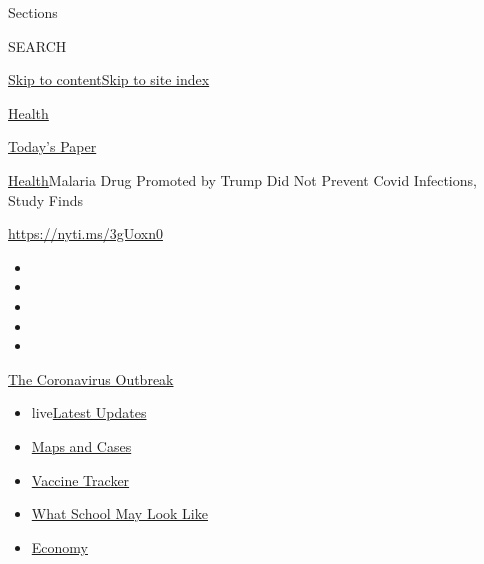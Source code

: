 Sections

SEARCH

\protect\hyperlink{site-content}{Skip to
content}\protect\hyperlink{site-index}{Skip to site index}

\href{https://www.nytimes3xbfgragh.onion/section/health}{Health}

\href{https://myaccount.nytimes3xbfgragh.onion/auth/login?response_type=cookie\&client_id=vi}{}

\href{https://www.nytimes3xbfgragh.onion/section/todayspaper}{Today's
Paper}

\href{/section/health}{Health}\textbar{}Malaria Drug Promoted by Trump
Did Not Prevent Covid Infections, Study Finds

\url{https://nyti.ms/3gUoxn0}

\begin{itemize}
\item
\item
\item
\item
\item
\end{itemize}

\href{https://www.nytimes3xbfgragh.onion/news-event/coronavirus?action=click\&pgtype=Article\&state=default\&region=TOP_BANNER\&context=storylines_menu}{The
Coronavirus Outbreak}

\begin{itemize}
\tightlist
\item
  live\href{https://www.nytimes3xbfgragh.onion/2020/08/01/world/coronavirus-covid-19.html?action=click\&pgtype=Article\&state=default\&region=TOP_BANNER\&context=storylines_menu}{Latest
  Updates}
\item
  \href{https://www.nytimes3xbfgragh.onion/interactive/2020/us/coronavirus-us-cases.html?action=click\&pgtype=Article\&state=default\&region=TOP_BANNER\&context=storylines_menu}{Maps
  and Cases}
\item
  \href{https://www.nytimes3xbfgragh.onion/interactive/2020/science/coronavirus-vaccine-tracker.html?action=click\&pgtype=Article\&state=default\&region=TOP_BANNER\&context=storylines_menu}{Vaccine
  Tracker}
\item
  \href{https://www.nytimes3xbfgragh.onion/interactive/2020/07/29/us/schools-reopening-coronavirus.html?action=click\&pgtype=Article\&state=default\&region=TOP_BANNER\&context=storylines_menu}{What
  School May Look Like}
\item
  \href{https://www.nytimes3xbfgragh.onion/live/2020/07/31/business/stock-market-today-coronavirus?action=click\&pgtype=Article\&state=default\&region=TOP_BANNER\&context=storylines_menu}{Economy}
\end{itemize}

